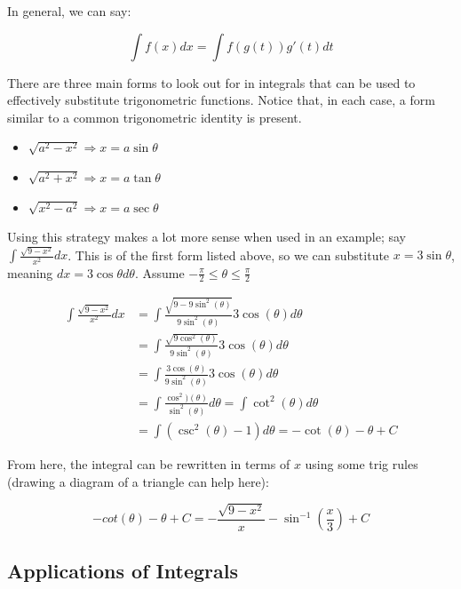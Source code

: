 \documentclass[12pt]{article}
\begin{document}
In general, we can say:

$$
\int f(x) dx = \int f(g(t)) g'(t) dt
$$

There are three main forms to look out for in integrals that can be used to effectively substitute trigonometric functions. Notice that, in each case, a form similar to a common trigonometric identity is present.

\begin{itemize}
    \item $\sqrt{a^2-x^2}  \Rightarrow x = a \sin \theta $ 
    
    \item $\sqrt{a^2+x^2} \Rightarrow x = a \tan \theta$
    
    \item $\sqrt{x^2-a^2} \Rightarrow x = a \sec \theta$
\end{itemize}

Using this strategy makes a lot more sense when used in an example; say $\int \frac{\sqrt{9-x^2}}{x^2} dx$. This is of the first form listed above, so we can substitute $x=3\sin \theta$, meaning $dx = 3\cos\theta d\theta$. Assume $-\frac{\pi}{2} \leq \theta \leq \frac{\pi}{2}$

\begin{equation}
    \begin{split}
        \int \frac{\sqrt{9-x^2}}{x^2}dx &= \int \frac{\sqrt{9-9\sin^2(\theta)}}{9\sin^2(\theta)}3\cos(\theta)d\theta\\
        &= \int \frac{\sqrt{9\cos^2(\theta)}}{9\sin^2(\theta)}3\cos(\theta)d\theta\\
        &= \int \frac{3\cos(\theta)}{9\sin^2(\theta)}3\cos(\theta)d\theta\\
        &= \int \frac{\cos^2)(\theta)}{\sin^2(\theta)}d\theta = \int \cot^2(\theta) d\theta\\
        &= \int (\csc^2(\theta)-1)d\theta = -\cot(\theta) -\theta + C
    \end{split}
\end{equation}

From here, the integral can be rewritten in terms of $x$ using some trig rules (drawing a diagram of a triangle can help here):

$$-cot(\theta)-\theta + C = -\frac{\sqrt{9-x^2}}{x}-\sin^{-1}(\frac{x}{3})+C$$
\subsection{Applications of Integrals}
\end{document}
